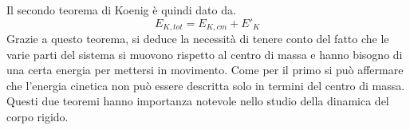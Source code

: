 \documentclass[10pt,a4paper]{book}
\begin{document}
Il secondo teorema di Koenig è quindi dato da.
\[
	\boxed{E_{K,tot} = E_{K,cm} + E'_K}
\]
Grazie a questo teorema, si deduce la necessità di tenere conto del fatto che le varie parti del sistema si muovono rispetto al centro di massa e hanno bisogno di una certa energia per mettersi in movimento.
Come per il primo si può affermare che l'energia cinetica non può essere descritta solo in termini del centro di massa.
Questi due teoremi hanno importanza notevole nello studio della dinamica del corpo rigido.
\end{document}
